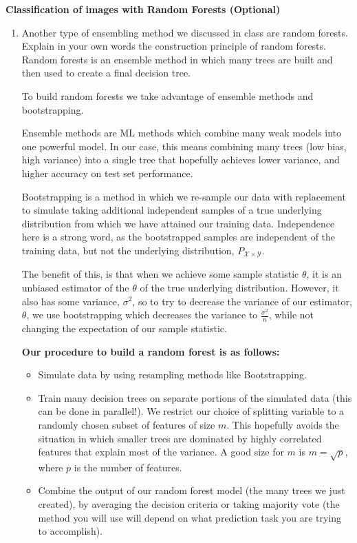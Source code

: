 \documentclass{article}
\newcommand{\nyuparagraph}[1]{\vspace{0.3cm}\textcolor{nyupurple}{\bf \large #1}\\}
\theoremstyle{plain}
\theoremstyle{definition}
\begin{document}
\nyuparagraph{Classification of images with Random Forests (Optional)}
\begin{enumerate}
  \setcounter{enumi}{\value{saveenum}}
\item Another type of ensembling method we discussed in class are random forests. Explain in your own words the construction principle of random forests.\\

\subitem
Random forests is an ensemble method in which many trees are built and then used to create a final decision tree.

To build random forests we take advantage of ensemble methods and bootstrapping.

Ensemble methods are ML methods which combine many weak models into one powerful model. In our case, this means combining many trees (low bias, high variance) into a single tree that hopefully achieves lower variance, and higher accuracy on test set performance.


Bootstrapping is a method in which we re-sample our data with replacement to simulate taking additional independent samples of a true underlying distribution from which we have attained our training data. Independence here is a strong word, as the bootstrapped samples are independent of the training data, but not the underlying distribution, $P_{\mathcal{X}\times \mathcal{Y}}$.

The benefit of this, is that when we achieve some sample statistic $\theta$, it is an unbiased estimator of the $\theta$ of the true underlying distribution. However, it also has some variance, $\sigma^2$, so to try to decrease the variance of our estimator, $\theta$, we use bootstrapping which decreases the variance to $\frac{\sigma^2}{n}$, while not changing the expectation of our sample statistic.

\textbf{Our procedure to build a random forest is as follows:}

\begin{itemize}
    \item Simulate data by using resampling methods like Bootstrapping.
    \item Train many decision trees on separate portions of the simulated data (this can be done in parallel!). We restrict our choice of splitting variable to a randomly chosen subset of features of size $m$. This hopefully avoids the situation in which smaller trees are dominated by highly correlated features that explain most of the variance. A good size for $m$ is $m = \sqrt{p}$, where $p$ is the number of features.
    \item Combine the output of our random forest model (the many trees we just created), by averaging the decision criteria or taking majority vote (the method you will use will depend on what prediction task you are trying to accomplish).
\end{itemize}




\end{enumerate}
\end{document}
